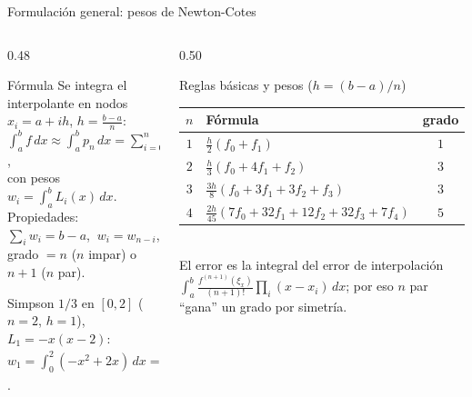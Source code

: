 \documentclass[aspectratio=169,10pt]{beamer}
\begin{document}
\begin{frame}{Formulación general: pesos de Newton-Cotes}
\begin{columns}[T]
\begin{column}{0.48\textwidth}
\begin{cardidea}{Fórmula}{\faSuperscript}
{\footnotesize Se integra el interpolante en nodos $x_i=a+ih$, $h=\tfrac{b-a}{n}$:\\[0.4mm]
$\displaystyle\int_a^b f\,dx\approx\int_a^b p_n\,dx=\sum_{i=0}^n w_i f(x_i)$,\\[0.8mm]
con pesos $w_i=\displaystyle\int_a^b L_i(x)\,dx$.\\[1.0mm]
Propiedades: $\sum_i w_i=b-a$, $\ w_i=w_{n-i}$,\\[0.2mm]
grado $=n$ ($n$ impar) o $n+1$ ($n$ par).}
\end{cardidea}
\vspace{1mm}
\begin{cardnota}[\faListOl]
{\footnotesize Simpson $1/3$ en $[0,2]$ ($n{=}2$, $h{=}1$), $L_1=-x(x-2)$:\\[0.4mm]
$w_1=\int_0^2(-x^2{+}2x)\,dx=[-\tfrac{x^3}{3}{+}x^2]_0^2=\tfrac43=\tfrac h3\cdot4$.}
\end{cardnota}
\end{column}
\begin{column}{0.50\textwidth}
\begin{cardgear}{Reglas básicas y pesos ($h=(b-a)/n$)}{\faTable}
\centering
{\footnotesize\renewcommand{\arraystretch}{1.4}\setlength{\tabcolsep}{4pt}
\begin{tabular}{c|l|c}
$n$ & Fórmula & grado\\\hline
$1$ & $\tfrac{h}{2}(f_0+f_1)$ & $1$\\
$2$ & $\tfrac{h}{3}(f_0+4f_1+f_2)$ & $3$\\
$3$ & $\tfrac{3h}{8}(f_0+3f_1+3f_2+f_3)$ & $3$\\
$4$ & $\tfrac{2h}{45}(7f_0{+}32f_1{+}12f_2{+}32f_3{+}7f_4)$ & $5$\\
\end{tabular}}\\[1.4mm]
{\footnotesize El error es la integral del error de interpolación $\displaystyle\int_a^b\tfrac{f^{(n+1)}(\xi_x)}{(n+1)!}\prod_i(x-x_i)\,dx$; por eso $n$ par ``gana'' un grado por simetría.}
\end{cardgear}
\end{column}
\end{columns}
\end{frame}
\end{document}
